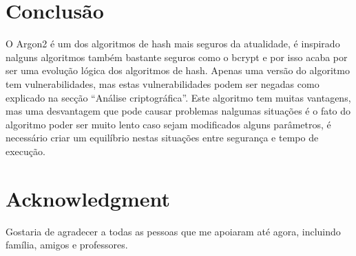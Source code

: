 \documentclass[conference]{IEEEtran}
\begin{document}
\section{Conclusão}

O Argon2 é um dos algoritmos de hash mais seguros da atualidade, é inspirado nalguns 
algoritmos também bastante seguros como o bcrypt e por isso acaba por ser uma 
evolução lógica dos algoritmos de hash. Apenas uma versão do algoritmo tem 
vulnerabilidades, mas estas vulnerabilidades podem ser negadas como explicado na 
secção “Análise criptográfica”. Este algoritmo tem muitas vantagens, mas uma 
desvantagem que pode causar problemas nalgumas situações é o fato do algoritmo 
poder ser muito lento caso sejam modificados alguns parâmetros, é necessário 
criar um equilíbrio nestas situações entre segurança e tempo de execução.

\section*{Acknowledgment}

Gostaria de agradecer a todas as pessoas que me apoiaram até agora, incluindo
família, amigos e professores.



\end{document}
